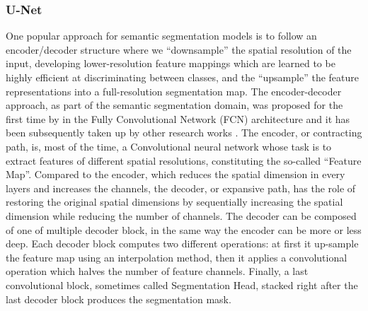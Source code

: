 \subsubsection{U-Net} \label{U-Net}

One popular approach for semantic segmentation models is to follow an encoder/decoder structure where we “downsample” the spatial resolution of the input, developing lower-resolution feature mappings which are learned to be highly efficient at discriminating between classes, and the “upsample” the feature representations into a full-resolution segmentation map. The encoder-decoder approach, as part of the semantic segmentation domain, was proposed for the first time by \citet{long2015fully} in the Fully Convolutional Network (FCN) architecture and it has been subsequently taken up by other research works \citep{ronneberger2015u,zhao2017pyramid,chen2017rethinking,chen2018encoder,badrinarayanan2017segnet}. The encoder, or contracting path, is, most of the time, a Convolutional neural network whose task is to extract features of different spatial resolutions, constituting the so-called “Feature Map”. Compared to the encoder, which reduces the spatial dimension in every layers and increases the channels, the decoder, or expansive path, has the role of restoring the original spatial dimensions by sequentially increasing the spatial dimension while reducing the number of channels. The decoder can be composed of one of multiple decoder block, in the same way the encoder can be more or less deep. Each decoder block computes two different operations: at first it up-sample the feature map using an interpolation method, then it applies a convolutional operation which halves the number of feature channels. Finally, a last convolutional block, sometimes called Segmentation Head, stacked right after the last decoder block produces the segmentation mask. 

